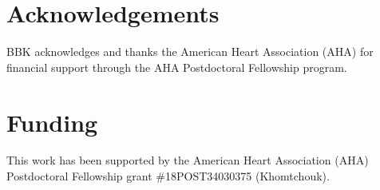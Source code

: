 \documentclass[letter]{bioinfo}
\begin{document}
	
	\enlargethispage{12pt}
	
	
	
	
	\section*{Acknowledgements}
	
	BBK acknowledges and thanks the American Heart Association (AHA) for financial support through the AHA Postdoctoral Fellowship program.
	\vspace*{-12pt}
	
	\section*{Funding}
	
	This work has been supported by the American Heart Association (AHA) Postdoctoral Fellowship grant \#18POST34030375 (Khomtchouk).\vspace*{-12pt}
	
	
	
	
	
	
\end{document}
